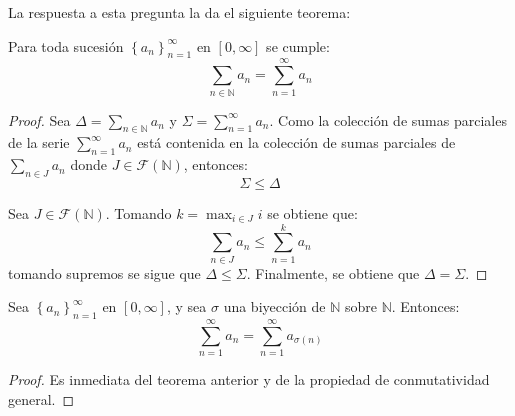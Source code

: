 \documentclass[12pt]{report}
\theoremstyle{largebreak}
\begin{document}
    La respuesta a esta pregunta la da el siguiente teorema:

    \begin{theor}
        Para toda sucesión $\left\{a_n \right\}_{n=1}^\infty$ en $[0,\infty]$ se cumple:
        \begin{equation*}
            \sum_{n\in\mathbb{N}}a_n=\sum_{n=1}^{\infty}a_n
        \end{equation*}
    \end{theor}

    \begin{proof}
        Sea $\Delta=\sum_{n\in\mathbb{N}}a_n$ y $\Sigma=\sum_{n=1}^{\infty}a_n$. Como la colección de sumas parciales de la serie $\sum_{n=1}^{\infty}a_n$ está contenida en la colección de sumas parciales de $\sum_{n\in J }a_n$ donde $J\in \mathcal{F}(\mathbb{N})$, entonces:
        \begin{equation*}
            \Sigma\leq\Delta
        \end{equation*}
        
        Sea $J\in \mathcal{F}(\mathbb{N})$. Tomando $k=\max_{i\in J} i$ se obtiene que:
        \begin{equation*}
            \sum_{n\in J }a_n\leq\sum_{n=1 }^{k}a_n
        \end{equation*}
        tomando supremos se sigue que $\Delta\leq\Sigma$. Finalmente, se obtiene que $\Delta=\Sigma$.

    \end{proof}

    \begin{cor}
        Sea $\left\{a_n \right\}_{n=1}^\infty$ en $[0,\infty]$, y sea $\sigma$ una biyección de $\mathbb{N}$ sobre $\mathbb{N}$. Entonces:
        \begin{equation*}
            \sum_{n=1}^{\infty}a_n=\sum_{n=1}^{\infty}a_{\sigma(n) }
        \end{equation*}
    \end{cor}

    \begin{proof}
        Es inmediata del teorema anterior y de la propiedad de conmutatividad general.
    \end{proof}
\end{document}
